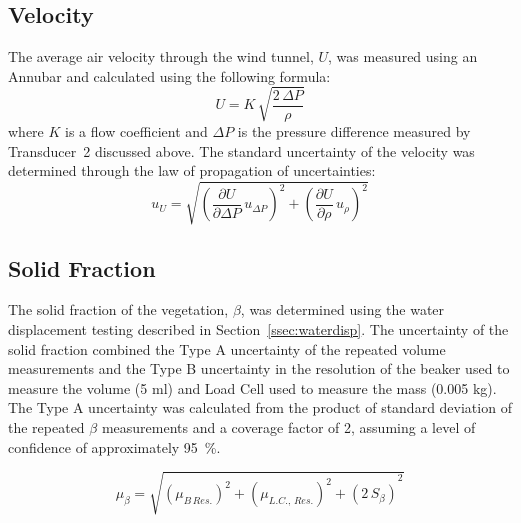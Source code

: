 \documentclass[12pt]{article}
\begin{document}
\subsection{Velocity}
\label{ssec:VelUncertainty}

The average air velocity through the wind tunnel, $U$, was measured using an Annubar and calculated using the following formula:
\begin{equation}
\label{eq:Velocity}
U = K \, \sqrt{\frac{2 \, \Delta P}{\rho}}
\end{equation}
where $K$ is a flow coefficient and $\Delta P$ is the pressure difference measured by Transducer~2 discussed above. The standard uncertainty of the velocity was determined through the law of propagation of uncertainties:
\begin{equation}
\label{eq:Velocityuncertainty}
u_{\scriptscriptstyle U} = \sqrt{{\left( \frac{\partial U}{\partial \Delta P}\,u_{\scriptscriptstyle \Delta P} \right) }^2+{\left(\frac{\partial U}{\partial \rho}\,u_{\scriptscriptstyle \rho}\right)}^2}
\end{equation}


\subsection{Solid Fraction}\label{ssec:SFUncertainty}
The solid fraction of the vegetation, $\beta$, was determined using the water displacement testing described in Section~\ref{ssec:waterdisp}. The uncertainty of the solid fraction combined the Type A uncertainty of the repeated volume measurements and the Type B uncertainty in the resolution of the beaker used to measure the volume (5 ml) and Load Cell used to measure the mass (0.005 kg). The Type A uncertainty was calculated from the product of standard deviation of the repeated $\beta$ measurements and a coverage factor of 2, assuming a level of confidence of approximately 95~\%.

\begin{equation}
\label{eq:betauncertainty}
\mu_{\beta} = \sqrt{{(\mu_{B\,Res.})^2+(\mu_{L.C.,\,Res.})^2+(2\,S_{\beta})}^2}
\end{equation}
\end{document}
